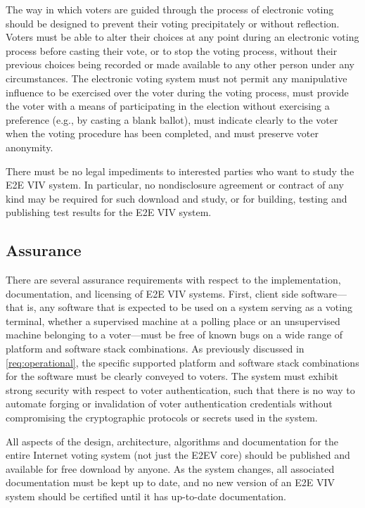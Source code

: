 The way in which voters are guided through the process of electronic
voting should be designed to prevent their voting precipitately or
without reflection. Voters must be able to alter their choices at any
point during an electronic voting process before casting their vote,
or to stop the voting process, without their previous choices being
recorded or made available to any other person under any
circumstances. The electronic voting system must not permit any
manipulative influence to be exercised over the voter during the
voting process, must provide the voter with a means of participating
in the election without exercising a preference (e.g., by casting a
blank ballot), must indicate clearly to the voter when the voting
procedure has been completed, and must preserve voter anonymity.

There must be no legal impediments to interested parties who want to
study the E2E VIV system. In particular, no nondisclosure agreement or
contract of any kind may be required for such download and study, or
for building, testing and publishing test results for the E2E VIV
system.

\subsection{Assurance}

There are several assurance requirements with respect to the
implementation, documentation, and licensing of E2E VIV
systems. First, client side software---that is, any software that is
expected to be used on a system serving as a voting terminal, whether
a supervised machine at a polling place or an unsupervised machine
belonging to a voter---must be free of known bugs on a wide range of
platform and software stack combinations. As previously discussed in
\autoref{req:operational}, the specific supported platform and
software stack combinations for the software must be clearly conveyed
to voters. The system must exhibit strong security with respect to
voter authentication, such that there is no way to automate forging or
invalidation of voter authentication credentials without compromising
the cryptographic protocols or secrets used in the system.

All aspects of the design, architecture, algorithms and documentation
for the entire Internet voting system (not just the E2EV core) should
be published and available for free download by anyone. As the system
changes, all associated documentation must be kept up to date, and no
new version of an E2E VIV system should be certified until it has
up-to-date documentation. 

